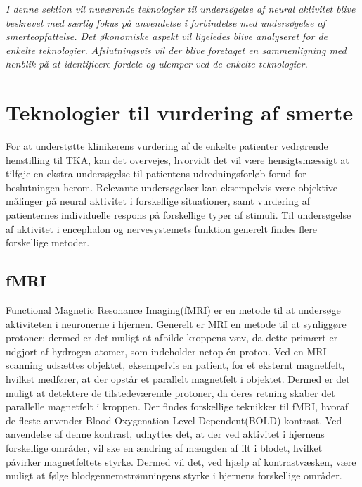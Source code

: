 \textit{I denne sektion vil nuværende teknologier til undersøgelse af neural aktivitet blive beskrevet med særlig fokus på anvendelse i forbindelse med undersøgelse af smerteopfattelse. Det økonomiske aspekt vil ligeledes blive analyseret for de enkelte teknologier. Afslutningsvis vil der blive foretaget en sammenligning med henblik på at identificere fordele og ulemper ved de enkelte teknologier.}
\section{Teknologier til vurdering af smerte} %
For at understøtte klinikerens vurdering af de enkelte patienter vedrørende henstilling til TKA, kan det overvejes, hvorvidt det vil være hensigtsmæssigt at tilføje en ekstra undersøgelse til patientens udredningsforløb forud for beslutningen herom. Relevante undersøgelser kan eksempelvis være objektive målinger på neural aktivitet i forskellige situationer, samt vurdering af patienternes individuelle respons på forskellige typer af stimuli. Til undersøgelse af aktivitet i encephalon og nervesystemets funktion generelt findes flere forskellige metoder.
  
\subsection{fMRI}
Functional Magnetic Resonance Imaging(fMRI) er en metode til at undersøge aktiviteten i neuronerne i hjernen.
Generelt er MRI en metode til at synliggøre protoner; dermed er det muligt at afbilde kroppens væv, da dette primært er udgjort af hydrogen-atomer, som indeholder netop én proton.     
Ved en MRI-scanning udsættes objektet, eksempelvis en patient, for et eksternt magnetfelt, hvilket medfører, at der opstår et parallelt magnetfelt i objektet. Dermed er det muligt at detektere de tilstedeværende protoner, da deres retning skaber det parallelle magnetfelt i kroppen.\citep{Wals2009}
Der findes forskellige teknikker til fMRI, hvoraf de fleste anvender Blood Oxygenation Level-Dependent(BOLD) kontrast. Ved anvendelse af denne kontrast, udnyttes det, at der ved aktivitet i hjernens forskellige områder, vil ske en ændring af mængden af ilt i blodet, hvilket påvirker magnetfeltets styrke. Dermed vil det, ved hjælp af kontrastvæsken, være muligt at følge blodgennemstrømningens styrke i hjernens forskellige områder. \citep{Wals2009}

